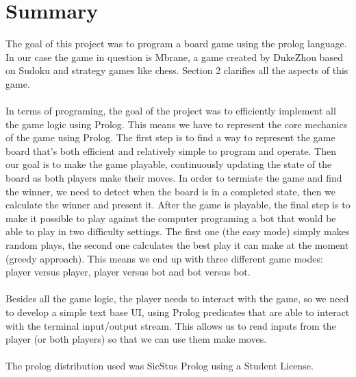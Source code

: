 \documentclass[a4paper]{article}
\begin{document}
\newpage

\section*{Summary}

The goal of this project was to program a board game using the prolog language. In our case the game in question is Mbrane, a 
game created by DukeZhou based on Sudoku and strategy games like chess. Section 2 clarifies all the aspects of this game.

\paragraph{}
In terms of programing, the goal of the project was to efficiently implement all the game logic using Prolog.  This means we have to
represent the core mechanics of the game using Prolog. The first step is to find a way to represent the game board that's both 
efficient and relatively simple to program and operate. Then our goal is to make the game playable, continuously updating the state of
the board as both players make their moves. In order to termiate the game and find the winner, we need to detect when the board is in a completed 
state, then we calculate the winner and present it. After the game is playable, the final step is to make it possible to play against the computer 
programing a bot that would be able to play in two difficulty settings. The first one (the easy mode) simply makes random plays, the second 
one calculates the best play it can make at the moment (greedy approach). This means we end up with three different game modes: player versus player,
player versus bot and bot versus bot. 

\paragraph{}
Besides all the game logic, the player needs to interact with the game, so we need to develop a simple text base UI, using
Prolog predicates that are able to interact with the terminal input/output stream. This allows us to read inputs from the
player (or both players) so that we can use them make moves.

\paragraph{}
The prolog distribution used was SicStus Prolog using a Student License.
\end{document}
